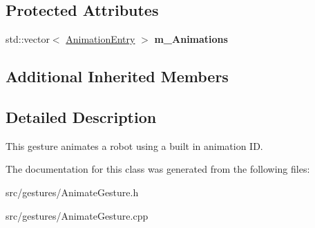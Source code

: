 \subsection*{Protected Attributes}
\begin{DoxyCompactItemize}
\item 
\mbox{\label{class_animate_gesture_a18ad52314eb12b9f3b1504ca0862517a}} 
std\+::vector$<$ \hyperlink{struct_animate_gesture_1_1_animation_entry}{Animation\+Entry} $>$ {\bfseries m\+\_\+\+Animations}
\end{DoxyCompactItemize}
\subsection*{Additional Inherited Members}


\subsection{Detailed Description}
This gesture animates a robot using a built in animation ID. 

The documentation for this class was generated from the following files\+:\begin{DoxyCompactItemize}
\item 
src/gestures/Animate\+Gesture.\+h\item 
src/gestures/Animate\+Gesture.\+cpp\end{DoxyCompactItemize}
